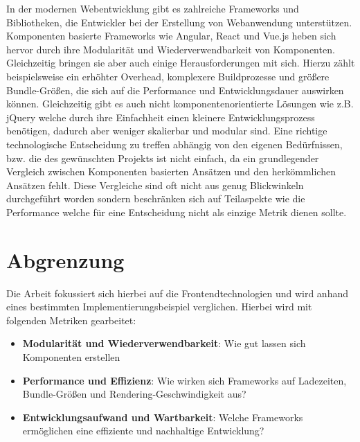 \documentclass[oneside]{ausarbeitung}
\begin{document}
In der modernen Webentwicklung gibt es zahlreiche Frameworks und Bibliotheken, die Entwickler bei der Erstellung von Webanwendung unterstützen. Komponenten basierte Frameworks wie Angular, React und Vue.js heben sich hervor durch ihre Modularität und Wiederverwendbarkeit von Komponenten. Gleichzeitig bringen sie aber auch einige Herausforderungen mit sich. Hierzu zählt beispielsweise ein erhöhter Overhead, komplexere Buildprozesse und größere Bundle-Größen, die sich auf die Performance und Entwicklungsdauer auswirken können.
Gleichzeitig gibt es auch nicht komponentenorientierte Lösungen wie z.B. jQuery welche durch ihre Einfachheit einen kleinere Entwicklungsprozess benötigen, dadurch aber weniger skalierbar und modular sind. 
Eine richtige technologische Entscheidung zu treffen abhängig von den eigenen Bedürfnissen, bzw. die des gewünschten Projekts ist nicht einfach, da ein grundlegender Vergleich zwischen Komponenten basierten Ansätzen und den herkömmlichen Ansätzen fehlt. Diese Vergleiche sind oft nicht aus genug Blickwinkeln durchgeführt worden sondern beschränken sich auf Teilaspekte wie die Performance welche für eine Entscheidung nicht als einzige Metrik dienen sollte. 

\section{Abgrenzung}

Die Arbeit fokussiert sich hierbei auf die Frontendtechnologien und wird anhand eines bestimmten Implementierungsbeispiel verglichen. Hierbei wird mit folgenden Metriken gearbeitet: 
\begin{itemize}
    \item \textbf{Modularität und Wiederverwendbarkeit}:  
          Wie gut lassen sich Komponenten erstellen 
    \item \textbf{Performance und Effizienz}:  
          Wie wirken sich Frameworks auf Ladezeiten, Bundle-Größen und Rendering-Geschwindigkeit aus?
    \item \textbf{Entwicklungsaufwand und Wartbarkeit}:  
          Welche Frameworks ermöglichen eine effiziente und nachhaltige Entwicklung?
\end{itemize}
\end{document}
